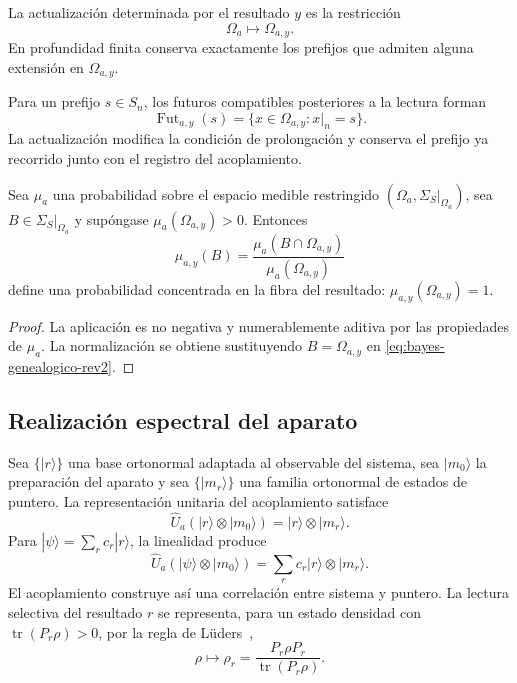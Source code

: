 \begin{definition}
La actualización determinada por el resultado \(y\) es la restricción
\[
 \Omega_a\longmapsto\Omega_{a,y}.
\]
En profundidad finita conserva exactamente los prefijos que admiten alguna
extensión en \(\Omega_{a,y}\).
\end{definition}

Para un prefijo \(s\in S_n\), los futuros compatibles posteriores a la
lectura forman
\[
 \operatorname{Fut}_{a,y}(s)
 =\{x\in\Omega_{a,y}:x|_n=s\}.
\]
La actualización modifica la condición de prolongación y conserva el prefijo
ya recorrido junto con el registro del acoplamiento.

\begin{proposition}
\label{prop:probabilidad-condicionada-medida-rev2}
Sea \(\mu_a\) una probabilidad sobre el espacio medible restringido
\((\Omega_a,\Sigma_S|_{\Omega_a})\), sea
\(B\in\Sigma_S|_{\Omega_a}\) y supóngase
\(\mu_a(\Omega_{a,y})>0\). Entonces
\begin{equation}
 \mu_{a,y}(B)
 =\frac{\mu_a(B\cap\Omega_{a,y})}
        {\mu_a(\Omega_{a,y})}
 \label{eq:bayes-genealogico-rev2}
\end{equation}
define una probabilidad concentrada en la fibra del resultado:
\(\mu_{a,y}(\Omega_{a,y})=1\).
\end{proposition}

\begin{proof}
La aplicación es no negativa y numerablemente aditiva por las propiedades de
\(\mu_a\). La normalización se obtiene sustituyendo
\(B=\Omega_{a,y}\) en \eqref{eq:bayes-genealogico-rev2}.
\end{proof}

\subsection{Realización espectral del aparato}

Sea \(\{|r\rangle\}\) una base ortonormal adaptada al observable del sistema,
sea \(|m_0\rangle\) la preparación del aparato y sea
\(\{|m_r\rangle\}\) una familia ortonormal de estados de puntero. La
representación unitaria del acoplamiento satisface
\begin{equation}
 \widehat U_a(|r\rangle\otimes|m_0\rangle)
 =|r\rangle\otimes|m_r\rangle.
 \label{eq:premedicion-espectral-rev2}
\end{equation}
Para \(|\psi\rangle=\sum_r c_r|r\rangle\), la linealidad produce
\[
 \widehat U_a(|\psi\rangle\otimes|m_0\rangle)
 =\sum_r c_r|r\rangle\otimes|m_r\rangle.
\]
El acoplamiento construye así una correlación entre sistema y puntero. La
lectura selectiva del resultado \(r\) se representa, para un estado densidad
con \(\operatorname{tr}(P_r\rho)>0\), por la regla de
Lüders~\cite{Lueders1950},
\begin{equation}
 \rho\longmapsto
 \rho_r=\frac{P_r\rho P_r}{\operatorname{tr}(P_r\rho)}.
 \label{eq:luders-genealogico-rev2}
\end{equation}

